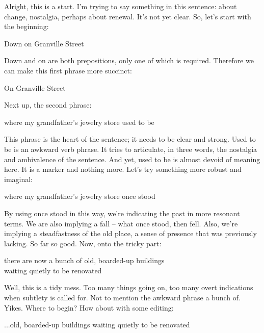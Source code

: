 \documentclass[letterpaper,10pt,headsepline]{scrreprt}
\begin{document}
Alright, this is a start. I'm trying to say something in this sentence: about change, nostalgia, perhaps about renewal. It's not yet clear. So, let's start with the beginning:

\vspace{1em}
\textsf{Down on Granville Street}
\vspace{1em}

\textsf{Down} and \textsf{on} are both prepositions, only one of which is required. Therefore we can make this first phrase more succinct:

\vspace{1em}
\textsf{On Granville Street}
\vspace{1em}

Next up, the second phrase:
\vspace{1em}

\textsf{where my grandfather's jewelry store used to be}
\vspace{1em}

This phrase is the heart of the sentence; it needs to be clear and strong. \textsf{Used to be} is an awkward verb phrase. It tries to articulate, in three words, the nostalgia and ambivalence of the sentence. And yet, \textsf{used to be} is almost devoid of meaning here. It is a marker and nothing more. Let's try something more robust and imaginal:
\vspace{1em}

\textsf{where my grandfather's jewelry store once stood}
\vspace{1em}

By using \textsf{once stood} in this way, we're indicating the past in more resonant terms. We are also implying a fall -- what once stood, then fell. Also, we're implying a steadfastness of the old place, a sense of presence that was previously lacking. So far so good. Now, onto the tricky part:
\vspace{1em}

\textsf{there are now a bunch of old, boarded-up buildings \\
waiting quietly to be renovated}
\vspace{1em}

Well, this is a tidy mess. Too many things going on, too many overt indications when subtlety is called for. Not to mention the awkward phrase \textsf{a bunch of}. Yikes. Where to begin? How about with some editing:
\vspace{1em}

\textsf{...old, boarded-up buildings waiting quietly to be renovated}
\vspace{1em}
\end{document}
